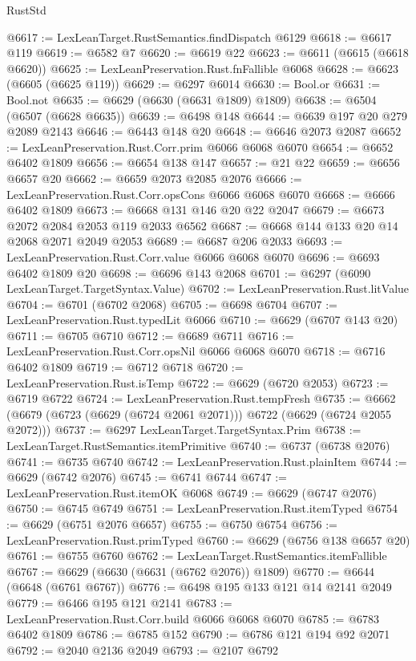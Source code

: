 \begin{lexlean}{RustStd}
\begin{coremodule}
@6617 := LexLeanTarget.RustSemantics.findDispatch @6129
@6618 := @6617 @119
@6619 := @6582 @7
@6620 := @6619 @22
@6623 := @6611 (@6615 (@6618 @6620))
@6625 := LexLeanPreservation.Rust.fnFallible @6068
@6628 := @6623 (@6605 (@6625 @119))
@6629 := @6297 @6014
@6630 := Bool.or
@6631 := Bool.not
@6635 := @6629 (@6630 (@6631 @1809) @1809)
@6638 := @6504 (@6507 (@6628 @6635))
@6639 := @6498 @148
@6644 := @6639 @197 @20 @279 @2089 @2143
@6646 := @6443 @148 @20
@6648 := @6646 @2073 @2087
@6652 := LexLeanPreservation.Rust.Corr.prim @6066 @6068 @6070
@6654 := @6652 @6402 @1809
@6656 := @6654 @138 @147
@6657 := @21 @22
@6659 := @6656 @6657 @20
@6662 := @6659 @2073 @2085 @2076
@6666 := LexLeanPreservation.Rust.Corr.opsCons @6066 @6068 @6070
@6668 := @6666 @6402 @1809
@6673 := @6668 @131 @146 @20 @22 @2047
@6679 := @6673 @2072 @2084 @2053 @119 @2033 @6562
@6687 := @6668 @144 @133 @20 @14 @2068 @2071 @2049 @2053
@6689 := @6687 @206 @2033
@6693 := LexLeanPreservation.Rust.Corr.value @6066 @6068 @6070
@6696 := @6693 @6402 @1809 @20
@6698 := @6696 @143 @2068
@6701 := @6297 (@6090 LexLeanTarget.TargetSyntax.Value)
@6702 := LexLeanPreservation.Rust.litValue
@6704 := @6701 (@6702 @2068)
@6705 := @6698 @6704
@6707 := LexLeanPreservation.Rust.typedLit @6066
@6710 := @6629 (@6707 @143 @20)
@6711 := @6705 @6710
@6712 := @6689 @6711
@6716 := LexLeanPreservation.Rust.Corr.opsNil @6066 @6068 @6070
@6718 := @6716 @6402 @1809
@6719 := @6712 @6718
@6720 := LexLeanPreservation.Rust.isTemp
@6722 := @6629 (@6720 @2053)
@6723 := @6719 @6722
@6724 := LexLeanPreservation.Rust.tempFresh
@6735 := @6662 (@6679 (@6723 (@6629 (@6724 @2061 @2071))) @6722 (@6629 (@6724 @2055 @2072)))
@6737 := @6297 LexLeanTarget.TargetSyntax.Prim
@6738 := LexLeanTarget.RustSemantics.itemPrimitive
@6740 := @6737 (@6738 @2076)
@6741 := @6735 @6740
@6742 := LexLeanPreservation.Rust.plainItem
@6744 := @6629 (@6742 @2076)
@6745 := @6741 @6744
@6747 := LexLeanPreservation.Rust.itemOK @6068
@6749 := @6629 (@6747 @2076)
@6750 := @6745 @6749
@6751 := LexLeanPreservation.Rust.itemTyped
@6754 := @6629 (@6751 @2076 @6657)
@6755 := @6750 @6754
@6756 := LexLeanPreservation.Rust.primTyped
@6760 := @6629 (@6756 @138 @6657 @20)
@6761 := @6755 @6760
@6762 := LexLeanTarget.RustSemantics.itemFallible
@6767 := @6629 (@6630 (@6631 (@6762 @2076)) @1809)
@6770 := @6644 (@6648 (@6761 @6767))
@6776 := @6498 @195 @133 @121 @14 @2141 @2049
@6779 := @6466 @195 @121 @2141
@6783 := LexLeanPreservation.Rust.Corr.build @6066 @6068 @6070
@6785 := @6783 @6402 @1809
@6786 := @6785 @152
@6790 := @6786 @121 @194 @92 @2071
@6792 := @2040 @2136 @2049
@6793 := @2107 @6792

\end{coremodule}
\end{lexlean}
